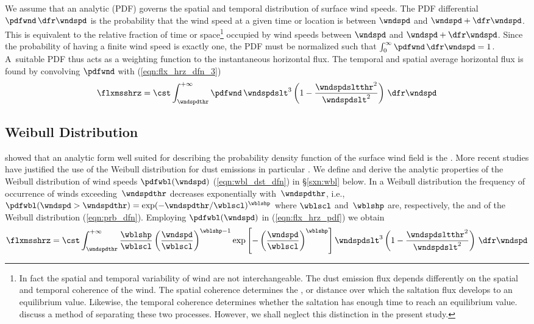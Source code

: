 \documentclass[12pt,twoside]{book}
\begin{document}
We assume that an analytic 
(PDF) governs the spatial and temporal distribution of surface wind
speeds.  
The PDF differential $\pdfwnd \,\dfr\wndspd$ is the probability that the
wind speed at a given time or location is between $\wndspd$ and 
$\wndspd + \dfr\wndspd$.
This is equivalent to the relative fraction of time or space\footnote{
In fact the spatial and temporal variability of wind are not
interchangeable.
The dust emission flux depends differently on the spatial and temporal
coherence of the wind.
The spatial coherence determines the , or distance over
which the saltation flux develops to an equilibrium value.
Likewise, the temporal coherence determines whether the saltation has
enough time to reach an equilibrium value.
\cite{SRL96} discuss a method of separating these two processes.
However, we shall neglect this distinction in the present study.}
occupied by wind speeds between $\wndspd$ and $\wndspd + \dfr\wndspd$.
Since the probability of having a finite wind speed is exactly one, the
PDF must be normalized such that 
$\int_{0}^{\infty} \pdfwnd \,\dfr\wndspd = 1$.
A~suitable PDF thus acts as a weighting function to the instantaneous 
horizontal flux.
The temporal and spatial average horizontal flux is found by
convolving $\pdfwnd$ with (\ref{eqn:flx_hrz_dfn_3})
\begin{equation}
\flxmsshrz = \cst \int_{\wndspdthr}^{+\infty} \pdfwnd \,
\wndspdslt^{3} \left(1-\frac{\wndspdsltthr^{2}}{\wndspdslt^{2}} \right) 
\,\dfr\wndspd
\label{eqn:flx_hrz_pdf}
\end{equation}

\subsection[Weibull Distribution]{Weibull Distribution}
\cite{JHM78} showed that an analytic form well suited for describing 
the probability density function of the surface wind field is the
.
More recent studies have justified the use of the Weibull distribution
for dust emissions in particular \cite[e.g.,][]{GiP88,SRL96,CMT04}.
We define and derive the analytic properties of the Weibull
distribution of wind speeds $\pdfwbl(\wndspd)$ (\ref{eqn:wbl_dst_dfn})
in \S\ref{sxn:wbl} below.    
In a Weibull distribution the frequency of occurrence of winds
exceeding~$\wndspdthr$ decreases exponentially with~$\wndspdthr$,
i.e., $\pdfwbl(\wndspd > \wndspdthr) =
\exp(-\wndspdthr/\wblscl)^{\wblshp}$ where $\wblscl$ and~$\wblshp$ are,
respectively, the  and 
 of the Weibull distribution
(\ref{eqn:prb_dfn}).   
Employing $\pdfwbl(\wndspd)$ in (\ref{eqn:flx_hrz_pdf}) we obtain 
\begin{equation}
\flxmsshrz = \cst \int_{\wndspdthr}^{+\infty} 
\frac{\wblshp}{\wblscl} 
\left( \frac{\wndspd}{\wblscl } \right)^{\wblshp - 1} 
\exp \left[ - \left( \frac{\wndspd}{\wblscl } \right)^{\wblshp} \right]
\wndspdslt^{3} \left( 1 - \frac{\wndspdsltthr^{2}}{\wndspdslt^{2}} \right) 
\,\dfr\wndspd
\label{eqn:flx_hrz_wbl}
\end{equation}
\end{document}
